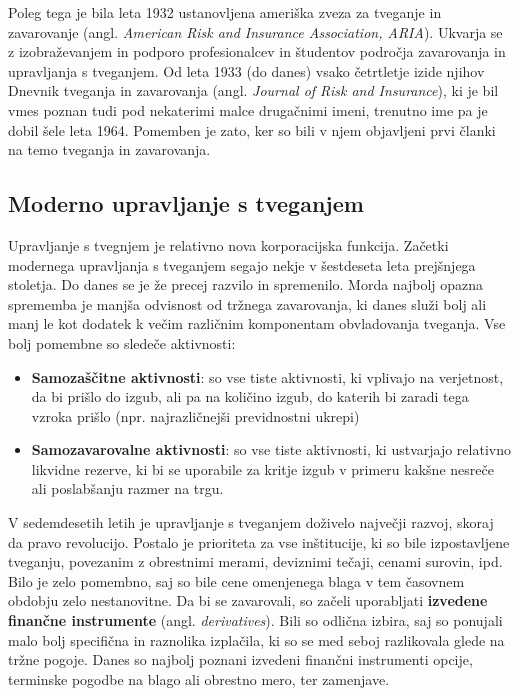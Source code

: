 \documentclass[12pt,a4paper]{amsart}
\theoremstyle{definition} %
\theoremstyle{plain} %
\begin{document}
Poleg tega je bila leta 1932 ustanovljena ameriška zveza za tveganje in zavarovanje (angl.
\textit{American Risk and Insurance Association, ARIA}). Ukvarja se z izobraževanjem in 
podporo profesionalcev in študentov področja zavarovanja in upravljanja s tveganjem. Od
leta 1933 (do danes) vsako četrtletje izide njihov Dnevnik tveganja in zavarovanja (angl. 
\textit{Journal of  Risk and Insurance}), ki je bil vmes poznan tudi pod nekaterimi malce 
drugačnimi imeni, trenutno ime pa je dobil šele leta 1964. Pomemben je zato, ker so bili v 
njem objavljeni prvi članki na temo tveganja in zavarovanja.


\subsection{Moderno upravljanje s tveganjem}
Upravljanje s tvegnjem je relativno nova korporacijska funkcija. Začetki modernega upravljanja
s tveganjem segajo nekje v šestdeseta leta prejšnjega stoletja. Do danes se je že precej razvilo
in spremenilo. Morda najbolj opazna sprememba je manjša odvisnost od tržnega zavarovanja,
ki danes služi bolj ali manj le kot dodatek k večim različnim komponentam obvladovanja tveganja.
Vse bolj pomembne so sledeče aktivnosti:
\begin{itemize}
  \item \textbf{Samozaščitne aktivnosti}: so vse tiste aktivnosti, ki vplivajo na verjetnost, da bi
	prišlo do izgub, ali pa na količino izgub, do katerih bi zaradi tega vzroka prišlo (npr. 
	najrazličnejši previdnostni ukrepi)
  \item \textbf{Samozavarovalne aktivnosti}: so vse tiste aktivnosti, ki ustvarjajo relativno 
	likvidne rezerve, ki bi se uporabile za kritje izgub v primeru kakšne nesreče ali poslabšanju
	razmer na trgu.
\end{itemize}

V sedemdesetih letih je upravljanje s tveganjem doživelo največji razvoj, skoraj da pravo 
revolucijo. Postalo je prioriteta za vse inštitucije, ki so bile izpostavljene tveganju, povezanim
z obrestnimi merami, deviznimi tečaji, cenami surovin, ipd. Bilo je zelo pomembno, saj so bile
cene omenjenega blaga v tem časovnem obdobju zelo nestanovitne. Da bi se zavarovali, so
začeli uporabljati \textbf{izvedene finančne instrumente} (angl. \textit{derivatives}). Bili so 
odlična izbira, saj so ponujali malo bolj specifična in raznolika izplačila, ki so se med seboj 
razlikovala glede na tržne pogoje. Danes so najbolj poznani izvedeni finančni instrumenti opcije,
terminske pogodbe na blago ali obrestno mero, ter zamenjave.
\end{document}
